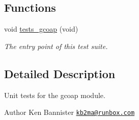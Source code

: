 \subsection*{Functions}
\begin{DoxyCompactItemize}
\item 
void \hyperlink{group__unittests_gaa26c3c3743ce9c1e363f071dacf5afa0}{tests\+\_\+gcoap} (void)
\begin{DoxyCompactList}\small\item\em The entry point of this test suite. \end{DoxyCompactList}\end{DoxyCompactItemize}


\subsection{Detailed Description}
Unit tests for the gcoap module. 

\begin{DoxyAuthor}{Author}
Ken Bannister \href{mailto:kb2ma@runbox.com}{\tt kb2ma@runbox.\+com} 
\end{DoxyAuthor}
